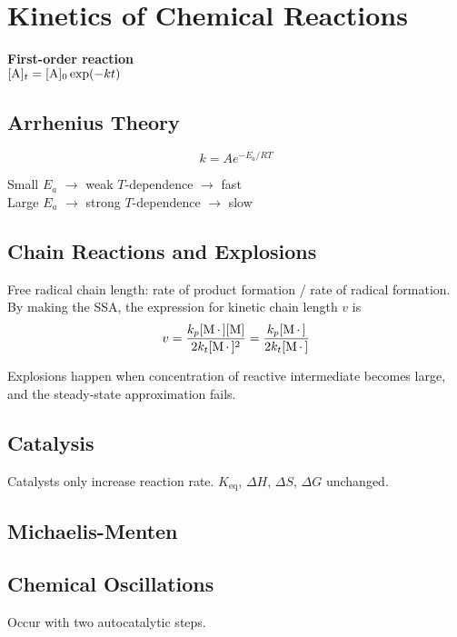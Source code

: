 \section{Kinetics of Chemical Reactions}

\textbf{First-order reaction} \\
 $[\ce{A}]_t = [\ce{A}]_0 \exp (-kt)$
\vspace{\baselineskip}

\subsection*{Arrhenius Theory}

\begin{equation*}
    k = Ae^{-E_a/RT}
\end{equation*}

Small $E_a$ $\rightarrow$ weak $T$-dependence $\rightarrow$ fast \\
Large $E_a$ $\rightarrow$ strong $T$-dependence $\rightarrow$ slow \\

\subsection*{Chain Reactions and Explosions}
Free radical chain length: rate of product formation / rate of radical formation. By making the SSA, the expression for kinetic chain length $v$ is
\begin{equation*}
    v = \frac{k_p [\ce{M.}][\ce{M}]}{2k_t[\ce{M.}]^2} = \frac{k_p[\ce{M.}]}{2k_t[\ce{M.}]}
\end{equation*}

Explosions happen when concentration of reactive intermediate becomes large, and the
steady-state approximation fails.

\subsection*{Catalysis}
Catalysts only increase reaction rate. $K_{\mathrm{eq}}$, $\Delta H$, $\Delta S$, $\Delta G$ unchanged.

\subsection*{Michaelis-Menten}

\subsection*{Chemical Oscillations}
Occur with two autocatalytic steps.